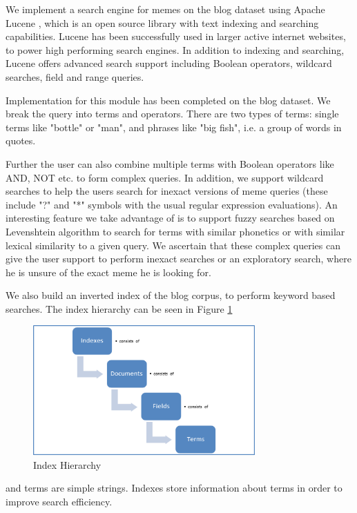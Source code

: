\documentclass{acm_proc_article-sp}
\begin{document}
We implement a search engine for memes on the blog dataset using Apache Lucene \cite{hatcher2005lucene}, which is an open source library with text indexing and searching capabilities. Lucene has been successfully used in larger active internet websites, to power high performing search engines. In addition to indexing and searching, Lucene offers advanced search support including Boolean operators, wildcard searches, field and range queries.

Implementation for this module has been completed on the blog dataset. We break the query into terms and operators. There are two types of terms: single terms like "bottle" or "man", and phrases like "big fish", i.e. a group of words in quotes.

Further the user can also combine multiple terms with Boolean operators like AND, NOT etc. to form complex queries. In addition, we support wildcard searches to help the users search for inexact versions of meme queries (these include "?" and "*" symbols with the usual regular expression evaluations). An interesting feature we take advantage of is to support fuzzy searches based on Levenshtein algorithm to search for terms with similar phonetics or with similar lexical similarity to a given query. We ascertain that these complex queries can give the user support to perform inexact searches or an exploratory search, where he is unsure of the exact meme he is looking for.

We also build an inverted index of the blog corpus, to perform keyword based searches. The index hierarchy can be seen in Figure \ref{fig1}
\begin{figure}[h]
\includegraphics[width=85mm]{graph.png}
\caption{Index Hierarchy}
\label{fig1}
\end{figure}
and terms are simple strings. Indexes store information about terms in order to improve search efficiency. 
\end{document}
